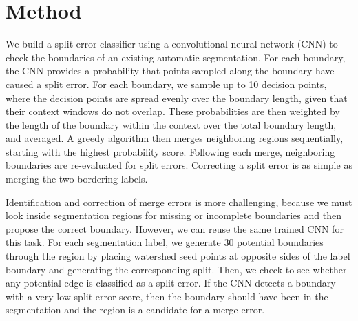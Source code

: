 \section{Method}
We build a split error classifier using a convolutional neural network (CNN) to check the boundaries of an existing automatic segmentation. For each boundary, the CNN provides a probability that points sampled along the boundary have caused a split error. For each boundary, we sample up to 10 decision points, where the decision points are spread evenly over the boundary length, given that their context windows do not overlap. These probabilities are then weighted by the length of the boundary within the context over the total boundary length, and averaged. A greedy algorithm then merges neighboring regions sequentially, starting with the highest probability score. Following each merge, neighboring boundaries are re-evaluated for split errors. Correcting a split error is as simple as merging the two bordering labels.

Identification and correction of merge errors is more challenging, because we must look inside segmentation regions for missing or incomplete boundaries and then propose the correct boundary. However, we can reuse the same trained CNN for this task. For each segmentation label, we generate 30 potential boundaries through the region by placing watershed seed points at opposite sides of the label boundary and generating the corresponding split. Then, we check to see whether any potential edge is classified as a split error. If the CNN detects a boundary with a very low split error score, then the boundary should have been in the segmentation and the region is a candidate for a merge error.







